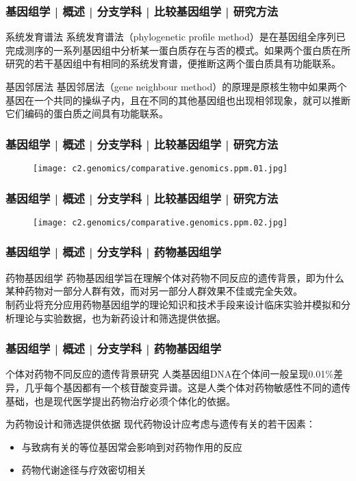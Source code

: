 \begin{frame}
  \frametitle{基因组学 | 概述 | 分支学科 | 比较基因组学 | 研究方法}
  \begin{block}{系统发育谱法}
系统发育谱法（phylogenetic profile method）是在基因组全序列已完成测序的一系列基因组中分析某一蛋白质存在与否的模式。如果两个蛋白质在所研究的若干基因组中有相同的系统发育谱，便推断这两个蛋白质具有功能联系。
  \end{block}
  \pause
  \begin{block}{基因邻居法}
    基因邻居法（gene neighbour method）的原理是原核生物中如果两个基因在一个共同的操纵子内，且在不同的其他基因组也出现相邻现象，就可以推断它们编码的蛋白质之间具有功能联系。
  \end{block}
\end{frame}

\begin{frame}
  \frametitle{基因组学 | 概述 | 分支学科 | 比较基因组学 | 研究方法}
  \begin{figure}
    \centering
    \texttt{[image: c2.genomics/comparative.genomics.ppm.01.jpg]}
  \end{figure}
\end{frame}

\begin{frame}
  \frametitle{基因组学 | 概述 | 分支学科 | 比较基因组学 | 研究方法}
  \begin{figure}
    \centering
    \texttt{[image: c2.genomics/comparative.genomics.ppm.02.jpg]}
  \end{figure}
\end{frame}

\begin{frame}
  \frametitle{基因组学 | 概述 | 分支学科 | 药物基因组学}
  \begin{block}{药物基因组学}
药物基因组学旨在理解个体对药物不同反应的遗传背景，即为什么某种药物对一部分人群有效，而对另一部分人群效果不佳或完全失效。\\
\vspace{1em}
制药业将充分应用药物基因组学的理论知识和技术手段来设计临床实验并模拟和分析理论与实验数据，也为新药设计和筛选提供依据。
  \end{block}
\end{frame}

\begin{frame}
  \frametitle{基因组学 | 概述 | 分支学科 | 药物基因组学}
  \begin{block}{个体对药物不同反应的遗传背景研究}
人类基因组DNA在个体间一般呈现0.01\%差异，几乎每个基因都有一个核苷酸变异谱。这是人类个体对药物敏感性不同的遗传基础，也是现代医学提出药物治疗必须个体化的依据。
  \end{block}
  \pause
  \begin{block}{为药物设计和筛选提供依据}
现代药物设计应考虑与遗传有关的若干因素：
\begin{itemize}
  \item 与致病有关的等位基因常会影响到对药物作用的反应
  \item 药物代谢途径与疗效密切相关
\end{itemize}
  \end{block}
\end{frame}

